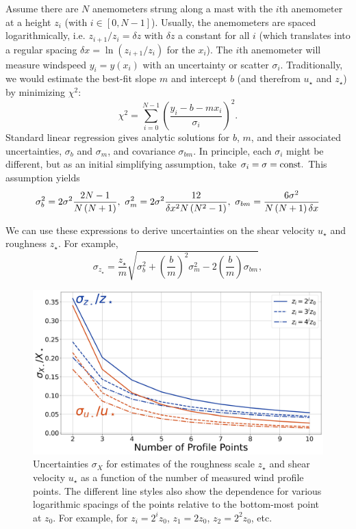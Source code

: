 \documentclass[linenumbers]{aastex631}
\begin{document}
Assume there are $N$ anemometers strung along a mast with the $i$th anemometer at a height $z_i$ (with $i \in [0, N-1]$). Usually, the anemometers are spaced logarithmically, i.e. $z_{i+1}/z_i = \delta z$ with $\delta z$ a constant for all $i$ (which translates into a regular spacing $\delta x = \ln(z_{i+1}/z_i)$ for the $x_i$). The $i$th anemometer will measure windspeed $y_i = y(x_i)$ with an uncertainty or scatter $\sigma_i$. Traditionally, we would estimate the best-fit slope $m$ and intercept $b$ (and therefrom $u_\star$ and $z_\star$) by minimizing $\chi^2$:
\begin{equation}
    \chi^2 = \sum_{i=0}^{N-1} \left( \frac{y_i - b - m x_i}{\sigma_i} \right)^2.\label{eqn:chisq}
\end{equation}
Standard linear regression gives analytic solutions for $b$, $m$, and their associated uncertainties, $\sigma_b$ and $\sigma_m$, and covariance $\sigma_{bm}$. In principle, each $\sigma_i$ might be different, but as an initial simplifying assumption, take $\sigma_i = \sigma = {\rm const.}$ This assumption yields
\begin{equation}
    \sigma_b^2 = 2\sigma^2 \frac{2N - 1}{N\left(N + 1\right)},\ 
    \sigma_m^2 = 2\sigma^2 \frac{12}{\delta x^2 N \left( N^2 - 1 \right)},\ 
    \sigma_{bm} = \frac{6 \sigma^2}{N \left( N + 1\right) \delta x \label{eqn:sigma_b-and-sigma_m} }\\
\end{equation}

We can use these expressions to derive uncertainties on the shear velocity $u_\star$ and roughness $z_\star$. For example, 
\begin{equation}
\sigma_{z_\star} = \frac{z_\star}{m} \sqrt{ \sigma_b^2 + \left( \frac{b}{m} \right)^2 \sigma_m^2 - 2 \left( \frac{b}{m} \right) \sigma_{b m}},
\end{equation}

\begin{figure}
    \centering
    \includegraphics[width=\textwidth]{figures and data/fractional_uncertainties.jpg}
    \caption{Uncertainties $\sigma_X$ for estimates of the roughness scale $z_\star$ and shear velocity $u_\star$ as a function of the number of measured wind profile points. The different line styles also show the dependence for various logarithmic spacings of the points relative to the bottom-most point at $z_0$. For example, for $z_i = 2^i z_0$, $z_1 = 2 z_0$, $z_2 = 2^2 z_0$, etc.}
    \label{fig:fractional_uncertainties}
\end{figure}
\end{document}

